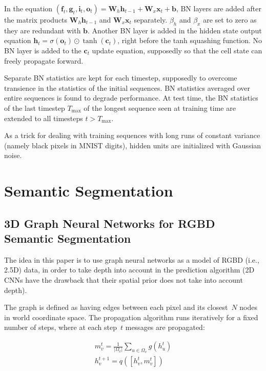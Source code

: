 \documentclass[a4paper, 12pt]{article}
\begin{document}
In the equation
$(\mathbf{f}_t, \mathbf{g}_t, \mathbf{i}_t, \mathbf{o}_t) =
\mathbf{W}_h \mathbf{h}_{t - 1} + \mathbf{W}_x \mathbf{x}_t + \mathbf{b}$,
BN layers are added after the matrix products
$\mathbf{W}_h \mathbf{h}_{t - 1}$ and $\mathbf{W}_x \mathbf{x}_t$ separately.
$\beta_h$ and $\beta_x$ are set to zero as they are redundant with
$\mathbf{b}$. Another BN layer is added in the hidden state output equation
$\mathbf{h}_t = \sigma{(\mathbf{o}_t)} \odot \tanh{(\mathbf{c}_t)}$,
right before the tanh squashing function. No BN layer is added to the
$\mathbf{c}_t$ update equation, supposedly so that the cell state can freely
propagate forward.

Separate BN statistics are kept for each timestep, supposedly to overcome
transience in the statistics of the initial sequences. BN statistics averaged
over entire sequences is found to degrade performance. At test time, the BN
statistics of the last timestep $T_{\max}$ of the longest sequence seen at
training time are extended to all timesteps $t > T_{\max}$.

As a trick for dealing with training sequences with long runs of constant
variance (namely black pixels in MNIST digits), hidden units are initialized
with Gaussian noise.


\section{Semantic Segmentation}

\subsection{3D Graph Neural Networks for RGBD Semantic
            Segmentation~\cite{qi20173d}}

The idea in this paper is to use graph neural networks as a model of RGBD
(i.e., 2.5D) data, in order to take depth into account in the prediction
algorithm (2D CNNs have the drawback that their spatial prior does not take
into account depth).

The graph is defined as having edges between each pixel and its closest~$N$
nodes in world coordinate space. The propagation algorithm runs iteratively for
a fixed number of steps, where at each step~$t$ messages are propagated:

\begin{align*}
        m_v^t = \frac{1}{|\Omega_v|} \sum_{u \in \Omega_v} g(h_u^t) \\
        h_v^{t + 1} = q([h_v^t, m_v^t])
\end{align*}
\end{document}
